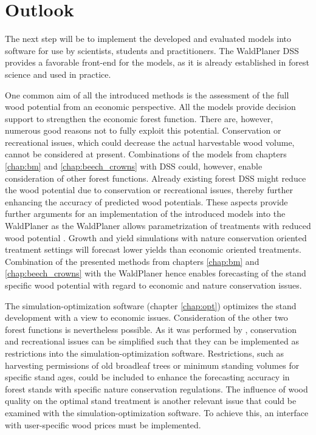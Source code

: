 \section{Outlook}
\label{sec:discussion:outlook}
The next step will be to implement the developed and evaluated models into software for use by scientists, students and practitioners. The WaldPlaner DSS provides a favorable front-end for the models, as it is already established in forest science and used in practice.

One common aim of all the introduced methods is the assessment of the full wood potential from an economic perspective. All the models provide decision support to strengthen the economic forest function. There are, however, numerous good reasons not to fully exploit this potential. Conservation or recreational issues, which could decrease the actual harvestable wood volume, cannot be considered at present. Combinations of the models from chapters \ref{chap:bm} and \ref{chap:beech_crowns} with DSS could, however, enable consideration of other forest functions. Already existing forest DSS might reduce the wood potential due to conservation or recreational issues, thereby further enhancing the accuracy of predicted wood potentials. These aspects provide further arguments for an implementation of the introduced models into the WaldPlaner as the WaldPlaner allows parametrization of treatments with reduced wood potential \citep[p. 90-93]{hansen_2014}. Growth and yield simulations with nature conservation oriented treatment settings will forecast lower yields than economic oriented treatments. Combination of the presented methods from chapters \ref{chap:bm} and \ref{chap:beech_crowns} with the WaldPlaner hence enables forecasting of the stand specific wood potential with regard to economic and nature conservation issues.

The si\-mu\-la\-tion-op\-ti\-mi\-za\-tion software (chapter \ref{chap:opt}) optimizes the stand development with a view to economic issues. Consideration of the other two forest functions is nevertheless possible. As it was performed by \citet{yousefpour_2009}, conservation and recreational issues can be simplified such that they can be implemented as restrictions into the si\-mu\-la\-tion-op\-ti\-mi\-za\-tion software. Restrictions, such as harvesting permissions of old broadleaf trees or minimum standing volumes for specific stand ages, could be included to enhance the forecasting accuracy in forest stands with specific nature conservation regulations. The influence of wood quality on the optimal stand treatment is another relevant issue that could be examined with the si\-mu\-la\-tion-op\-ti\-mi\-za\-tion software. To achieve this, an interface with user-specific wood prices must be implemented.

